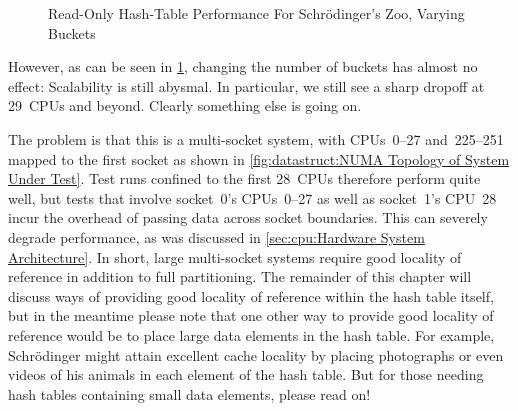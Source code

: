 \begin{figure}
\centering
{}
\caption{Read-Only Hash-Table Performance For Schr\"odinger's Zoo, Varying Buckets}
\label{fig:datastruct:Read-Only Hash-Table Performance For Schroedinger's Zoo; Varying Buckets}
\end{figure}

However, as can be seen in
\cref{fig:datastruct:Read-Only Hash-Table Performance For Schroedinger's Zoo; Varying Buckets},
changing the number of buckets has almost no effect:
Scalability is still abysmal.
In particular, we still see a sharp dropoff at 29~CPUs and beyond.
Clearly something else is going on.

The problem is that this is a multi-socket system, with CPUs~0--27
and~225--251 mapped to the first socket as shown in
\cref{fig:datastruct:NUMA Topology of System Under Test}.
Test runs confined to the first 28~CPUs therefore perform quite
well, but tests that involve socket~0's CPUs~0--27 as well as
socket~1's CPU~28 incur the overhead of passing data across
socket boundaries.
This can severely degrade performance, as was discussed in
\cref{sec:cpu:Hardware System Architecture}.
In short, large multi-socket systems require good locality of reference
in addition to full partitioning.
The remainder of this chapter will discuss ways of providing good
locality of reference within the hash table itself, but in the
meantime please note that one other way to provide good locality
of reference would be to place large data elements in the hash
table.
For example, Schr\"odinger might attain excellent cache locality by
placing photographs or even videos of his animals in each element of
the hash table.
But for those needing hash tables containing small data elements,
please read on!

